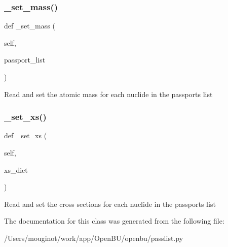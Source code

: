 \subsubsection{\texorpdfstring{\+\_\+set\+\_\+mass()}{\_set\_mass()}}
{\footnotesize\ttfamily def \+\_\+set\+\_\+mass (\begin{DoxyParamCaption}\item[{}]{self,  }\item[{}]{passport\+\_\+list }\end{DoxyParamCaption})\hspace{0.3cm}{\ttfamily [private]}}

\begin{DoxyVerb}Read and set the atomic mass for each nuclide in the passports list\end{DoxyVerb}
 \mbox{\label{classopenbu_1_1passlist_1_1_passlist_aa45dff0e552a6f90aef82cfd5c0691b9}} 
\subsubsection{\texorpdfstring{\+\_\+set\+\_\+xs()}{\_set\_xs()}}
{\footnotesize\ttfamily def \+\_\+set\+\_\+xs (\begin{DoxyParamCaption}\item[{}]{self,  }\item[{}]{xs\+\_\+dict }\end{DoxyParamCaption})\hspace{0.3cm}{\ttfamily [private]}}

\begin{DoxyVerb}Read and set the cross sections for each nuclide in the passports list\end{DoxyVerb}
 

The documentation for this class was generated from the following file\+:\begin{DoxyCompactItemize}
\item 
/\+Users/mouginot/work/app/\+Open\+B\+U/openbu/passlist.\+py\end{DoxyCompactItemize}
